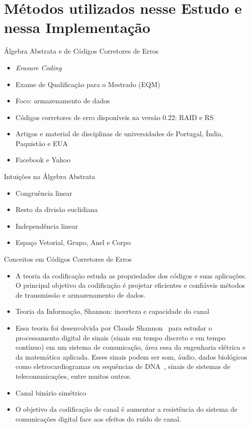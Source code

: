  \section{Métodos utilizados nesse Estudo e nessa Implementação}

  \begin{frame}{Álgebra Abstrata e de Códigos Corretores de Erros}
     \begin{itemize}
        \item<1-> \emph{Erasure Coding}
        \item<2-> Exame de Qualificação para o Mestrado (EQM)
        \item<2-> Foco: armazenamento de dados
        \item<3-> Códigos corretores de erro disponíveis na versão 0.22: RAID e RS
        \item<4-> Artigos e material de disciplinas de universidades de Portugal, Índia, Paquistão e EUA
        \item<5-> Facebook e Yahoo
     \end{itemize}
  \end{frame}

  \begin{frame}{Intuições na Álgebra Abstrata}
     \begin{itemize}
        \item<1-> Congruência linear
        \item<2-> Resto da divisão euclidiana
        \item<3-> Independência linear
        \item<4-> Espaço Vetorial, Grupo, Anel e Corpo
     \end{itemize}
  \end{frame}

  \begin{frame}{Conceitos em Códigos Corretores de Erros}
     \begin{itemize}
        \item<1-> A teoria da codificação estuda as propriedades dos códigos e suas aplicações. O principal objetivo da codificação é projetar eficientes e confiáveis métodos de transmissão e armazenamento de dados.
        \item<2-> Teoria da Informação, Shannon: incerteza e capacidade do canal
        \item<3-> Essa teoria foi desenvolvida por Claude Shannon~\cite{Shannon:1948} para estudar o processamento digital de sinais (sinais em tempo discreto e em tempo contínuo) em um sistema de comunicação, área essa da engenharia elétrica e da matemática aplicada. Esses  sinais podem ser som, áudio, dados biológicos como eletrocardiogramas ou sequências de DNA~\cite{Faria:2010,Faria:2012}, sinais de sistemas de telecomunicações, entre muitos outros.
        \item<4-> Canal binário simétrico
        \item<5-> O objetivo da codificação de canal é aumentar a resistência do sistema de comunicações digital face aos efeitos do ruído de canal.
     \end{itemize}
  \end{frame}


